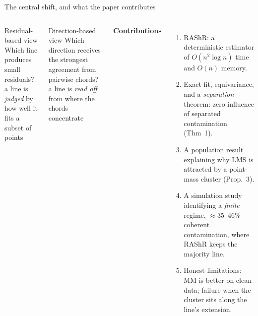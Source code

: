 \documentclass[aspectratio=169,9pt]{beamer}
\begin{document}
\begin{frame}{The central shift, and what the paper contributes}
\begin{columns}[T]
\begin{rwarn}{Residual-based view}
Which line produces small residuals?\\[2pt]
\small a line is \emph{judged} by how well it fits a subset of points
\end{rwarn}
\begin{rthm}{Direction-based view}{}{}
Which direction receives the strongest agreement from pairwise chords?\\[2pt]
\small a line is \emph{read off} from where the chords concentrate
\end{rthm}
\textbf{Contributions}
\begin{enumerate}\setlength\itemsep{3pt}\small
\item RAShR: a deterministic estimator of $O(n^2\log n)$ time and $O(n)$ memory.
\item Exact fit, equivariance, and a \emph{separation} theorem: zero influence of separated contamination (Thm~1).
\item A population result explaining why LMS is attracted by a point-mass cluster (Prop.~3).
\item A simulation study identifying a \emph{finite} regime, $\approx35$--$46\%$ coherent contamination, where RAShR keeps the majority line.
\item Honest limitations: MM is better on clean data; failure when the cluster sits along the line's extension.
\end{enumerate}
\end{columns}
\end{frame}

\end{document}
